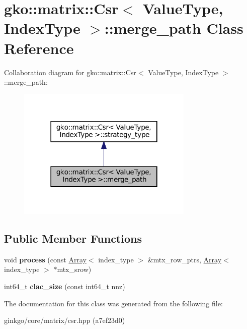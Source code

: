 \hypertarget{classgko_1_1matrix_1_1Csr_1_1merge__path}{}\section{gko\+:\+:matrix\+:\+:Csr$<$ Value\+Type, Index\+Type $>$\+:\+:merge\+\_\+path Class Reference}
\label{classgko_1_1matrix_1_1Csr_1_1merge__path}


Collaboration diagram for gko\+:\+:matrix\+:\+:Csr$<$ Value\+Type, Index\+Type $>$\+:\+:merge\+\_\+path\+:
\nopagebreak
\begin{figure}[H]
\begin{center}
\leavevmode
\includegraphics[width=238pt]{classgko_1_1matrix_1_1Csr_1_1merge__path__coll__graph}
\end{center}
\end{figure}
\subsection*{Public Member Functions}
\begin{DoxyCompactItemize}
\item 
\mbox{\label{classgko_1_1matrix_1_1Csr_1_1merge__path_a617d0a285a7851c025a56bf1ae096bc7}} 
void {\bfseries process} (const \hyperlink{classgko_1_1Array}{Array}$<$ index\+\_\+type $>$ \&mtx\+\_\+row\+\_\+ptrs, \hyperlink{classgko_1_1Array}{Array}$<$ index\+\_\+type $>$ $\ast$mtx\+\_\+srow)
\item 
\mbox{\label{classgko_1_1matrix_1_1Csr_1_1merge__path_aea68ffff5b689f63bbece61d5dc80112}} 
int64\+\_\+t {\bfseries clac\+\_\+size} (const int64\+\_\+t nnz)
\end{DoxyCompactItemize}


The documentation for this class was generated from the following file\+:\begin{DoxyCompactItemize}
\item 
ginkgo/core/matrix/csr.\+hpp (a7ef23d0)\end{DoxyCompactItemize}
